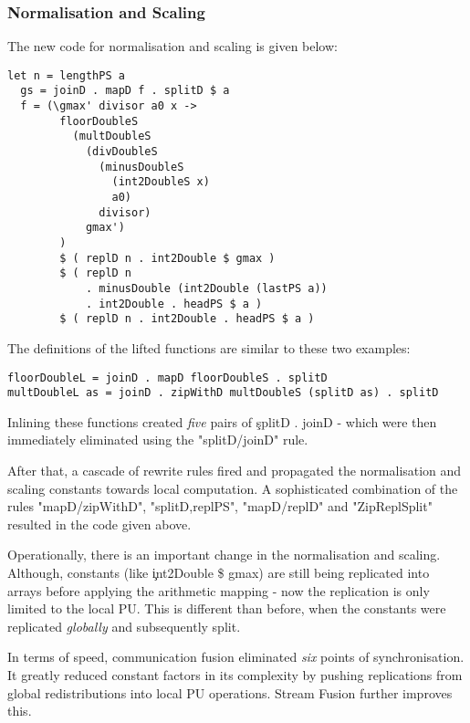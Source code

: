     \subsubsection{Normalisation and Scaling}
    The new code for normalisation and scaling is given below:
    \begin{lstlisting}
let n = lengthPS a
  gs = joinD . mapD f . splitD $ a
  f = (\gmax' divisor a0 x ->
        floorDoubleS
          (multDoubleS
            (divDoubleS
              (minusDoubleS
                (int2DoubleS x)
                a0)
              divisor)
            gmax')
        )
        $ ( replD n . int2Double $ gmax )
        $ ( replD n
            . minusDouble (int2Double (lastPS a))
            . int2Double . headPS $ a )
        $ ( replD n . int2Double . headPS $ a )
    \end{lstlisting}
    The definitions of the lifted functions are similar to these two examples:
    \begin{lstlisting}
floorDoubleL = joinD . mapD floorDoubleS . splitD
multDoubleL as = joinD . zipWithD multDoubleS (splitD as) . splitD
    \end{lstlisting}
    Inlining these functions created \emph{five} pairs of \c{splitD . joinD} - which were then immediately
    eliminated using the "splitD/joinD" rule.
    
    After that, a cascade of rewrite rules fired and propagated the normalisation and scaling
    constants towards local computation. A sophisticated combination of the rules
    "mapD/zipWithD", "splitD,replPS", "mapD/replD" and "ZipReplSplit" resulted in
    the code given above.
    
    Operationally, there is an important change in the normalisation and scaling.
    Although, constants (like \c{int2Double \$ gmax}) are still being replicated into arrays
    before applying the arithmetic mapping - now the replication
    is only limited to the local PU. This is different than before, when
    the constants were replicated \emph{globally} and subsequently split.
    
    In terms of speed, communication fusion eliminated \emph{six} points of synchronisation.
    It greatly reduced constant factors in its complexity by pushing
    replications from global redistributions into local PU operations.
    Stream Fusion further improves this.
    
